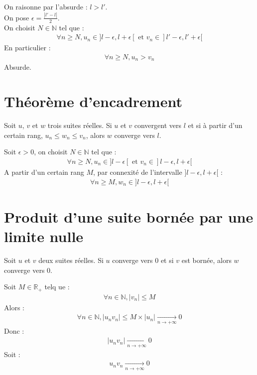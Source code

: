 \documentclass[../main.tex]{subfiles}
\begin{document}
On raisonne par l'absurde : $l > l'$. \\
On pose $\epsilon = \frac{|l' - l|}{2}$. \\
On choisit $N \in \mathbb{N}$ tel que : 
\begin{align*}
    \forall n \geq N, u_n \in ]l-\epsilon, l+\epsilon[ \text{ et } v_n \in ]l'-\epsilon, l'+\epsilon[
\end{align*}
En particulier : 
\begin{align*}
    \forall n \geq N, u_n > v_n
\end{align*}
Absurde. 

\setcounter{section}{36}
\section{Théorème d'encadrement}
\begin{tcolorbox}[title=Théorème 14.37, title filled=false, colframe=orange, colback=orange!10!white]
    Soit $u$, $v$ et $w$ trois suites réelles. Si $u$ et $v$ convergent vers $l$ et si à partir d'un certain rang, $u_n \leq w_n \leq v_n$, alors $w$ converge vers $l$. 
\end{tcolorbox}

Soit $\epsilon > 0$, on choisit $N \in \mathbb{N}$ tel que : 
\begin{align*}
    \forall n \geq N, u_n \in ]l-\epsilon[ \text{ et } v_n \in ]l-\epsilon, l+\epsilon[
\end{align*}
A partir d'un certain rang $M$, par connexité de l'intervalle $]l-\epsilon, l+\epsilon[$ : 
\begin{align*}
    \forall n \geq M, w_n \in ]l-\epsilon, l+\epsilon[
\end{align*}

\section{Produit d'une suite bornée par une limite nulle}
\begin{tcolorbox}[title=Théorème 14.38, title filled=false, colframe=orange, colback=orange!10!white]
    Soit $u$ et $v$ deux suites réelles. Si $u$ converge vers $0$ et si $v$ est bornée, alors $w$ converge vers $0$. 
\end{tcolorbox}

Soit $M \in \mathbb{R}_+$ telq ue : 
\begin{align*}
    \forall n \in \mathbb{N}, |v_n| \leq M
\end{align*}
Alors : 
\begin{align*}
    \forall n \in \mathbb{N}, |u_n v_n| \leq M \times |u_n| \underset{n \to +\infty}{\longrightarrow} 0
\end{align*}
Donc : 
\begin{align*}
    |u_n v_n| \underset{n \to +\infty}{\longrightarrow} 0
\end{align*}
Soit : 
\begin{align*}
    u_n v_n \underset{n \to +\infty}{\longrightarrow} 0
\end{align*}
\end{document}
